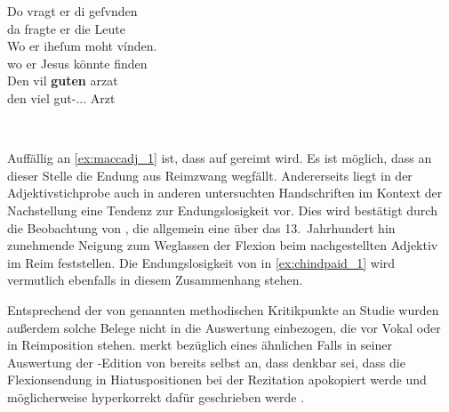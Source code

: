 \begin{exe}
\begin{xlist}
	\ex \label{ex:maccadj_2}
		\gll Do vragt er di geſvnden \\
			da fragte er die Leute \\
	\sn \gll Wo er iheſum moht vínden. \\
			wo er Jesus könnte finden \\
	\sn \gll Den vil \textbf{guten} arzat \\
			den viel gut-\Acc.\Sg.\MascM.\Wk{} Arzt \\
		\begin{taggedline}{\parencites%
			[\pno~6\rb, 31]{kc:M}[vgl.]%
			[\pno~3\vb, 26--28]{kc:A1}
			[\pno~4\rb, 28--30]{kc:H}
			[\pno~4\rb, 35--36]{kc:B1}
			[\pno~7\ra, 9--10]{kc:P}
			[\pno~4\ra, 24--27]{kc:C1}
			[\pno~12\va, 12--15]{kc:Z}
			[723--725]{schroeder1895}
		}
		\trans {}%
		\end{taggedline}
		\\
	\end{xlist}
\end{exe}

Auffällig an \cref{ex:maccadj_1} ist, dass   auf
  gereimt wird. Es ist möglich,
dass an dieser Stelle die Endung aus Reimzwang wegfällt. Andererseits liegt in
der Adjektivstichprobe auch in anderen untersuchten Handschriften im Kontext
der Nachstellung eine Tendenz zur Endungslosigkeit vor. Dies wird bestätigt
durch die Beobachtung von \citet[241]{ksw2}, die allgemein eine über das
13.~Jahrhundert hin zunehmende Neigung zum Weglassen der Flexion beim
nachgestellten Adjektiv im Reim feststellen. Die Endungslosigkeit von
 in \cref{ex:chindpaid_1} wird vermutlich ebenfalls in diesem
Zusammenhang stehen.

\label{phsec:kchiatus}
Entsprechend der von \citet{gjelsten1980} genannten methodischen Kritikpunkte
an  Studie wurden außerdem solche Belege nicht in die
Auswertung einbezogen, die vor Vokal oder in Reimposition stehen.
\citet{askedal1973} merkt bezüglich eines ähnlichen Falls in seiner Auswertung
der -Edition von \citet{maroldschroeder1969}
bereits selbst an, dass denkbar sei, dass die Flexionsendung  in
Hiatuspositionen bei der Rezitation apokopiert werde und möglicherweise
hyperkorrekt dafür  geschrieben werde \autocite[90--91]{askedal1973}.

